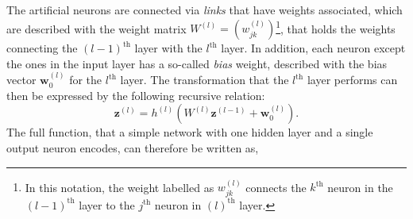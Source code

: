 The artificial neurons are connected via \emph{links} that have weights associated, which are described with the weight matrix $W^{(l)} = \left(w^{(l)}_{jk} \right)$\footnote{In this notation, the weight labelled as $w^{(l)}_{jk}$ connects the $k^\text{th}$ neuron in the $(l-1)^\text{th}$ layer to the $j^\text{th}$ neuron in $(l)^\text{th}$ layer.}, that holds the weights connecting the $(l-1)^{\text{th}}$ layer with the $l^{\text{th}}$ layer.
In addition, each neuron except the ones in the input layer has a so-called \emph{bias} weight, described with the bias vector $\pmb{w}^{(l)}_0$ for the $l^\text{th}$ layer.
The transformation that the $l^{\text{th}}$ layer performs can then be expressed by the following recursive relation:
\begin{equation}
    \label{eq:recursive-neuron-activation}
    \pmb{z}^{(l)} =  h^{(l)} \left( W^{(l)} \pmb{z}^{(l-1)}  + \pmb{w}^{(l)}_{0} \right).
\end{equation}
The full function, that a simple network with one hidden layer and a single output neuron encodes, can therefore be written as,
